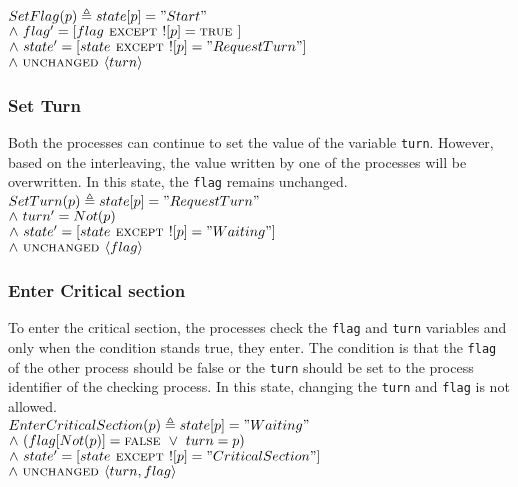 \documentclass[fleqn]{tukseminar}
\begin{document}
			$ SetFlag(p) \triangleq state[p] = "Start"$ \\
			\hspace*{0.8cm}$\land \  flag' = [flag \mbox{\textsc{ except }} ![p] = \mbox{\textsc{true }}]$\\
			\hspace*{0.8cm}$\land \   state' = [state \mbox{\textsc{ except }} ![p] = "RequestTurn"]$\\
			\hspace*{0.8cm}$\land \  \mbox{\textsc{unchanged }} \langle turn \rangle $
			
			\subsubsection{Set Turn}
			Both the processes can continue to set the value of the variable \lstinline|turn|. However, based on the
			interleaving, the value written by one of the processes will be overwritten. In this state, the \lstinline|flag|
			remains unchanged.\\
			
			$ SetTurn(p) \triangleq state[p] = "RequestTurn"$ \\
			\hspace*{0.8cm}$\land \  turn' = Not(p)$\\
			\hspace*{0.8cm}$\land \   state' = [state \mbox{\textsc{ except }} ![p] = "Waiting"]$\\
			\hspace*{0.8cm}$\land \  \mbox{\textsc{unchanged }} \langle flag \rangle $
			
			\subsubsection{Enter Critical section}
			To enter the critical section, the processes check the \lstinline|flag| and \lstinline|turn| variables and only
			when the condition stands true, they enter. The condition is that the \lstinline|flag| of the other process
			should be false or the \lstinline|turn| should be set to the process identifier of the checking process. In
			this state, changing the \lstinline|turn| and \lstinline|flag| is not allowed.\\
			
			$ EnterCriticalSection(p) \triangleq state[p] = "Waiting"$ \\
			\hspace*{0.8cm}$\land \  (flag[Not(p)] = \mbox{\textsc{false }} \lor \  turn = p)$\\
			\hspace*{0.8cm}$\land \   state' = [state \mbox{\textsc{ except }} ![p] = "CriticalSection"]$\\
			\hspace*{0.8cm}$\land \  \mbox{\textsc{unchanged }} \langle turn, flag \rangle $
			
\end{document}

